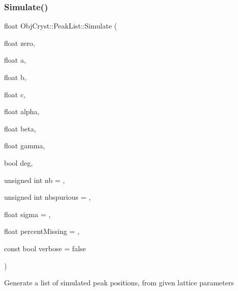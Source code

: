 \subsubsection{\texorpdfstring{Simulate()}{Simulate()}}
{\footnotesize\ttfamily float Obj\+Cryst\+::\+Peak\+List\+::\+Simulate (\begin{DoxyParamCaption}\item[{float}]{zero,  }\item[{float}]{a,  }\item[{float}]{b,  }\item[{float}]{c,  }\item[{float}]{alpha,  }\item[{float}]{beta,  }\item[{float}]{gamma,  }\item[{bool}]{deg,  }\item[{unsigned int}]{nb = {},  }\item[{unsigned int}]{nbspurious = {},  }\item[{float}]{sigma = {},  }\item[{float}]{percent\+Missing = {},  }\item[{const bool}]{verbose = {\ttfamily false} }\end{DoxyParamCaption})}

Generate a list of simulated peak positions, from given lattice parameters


